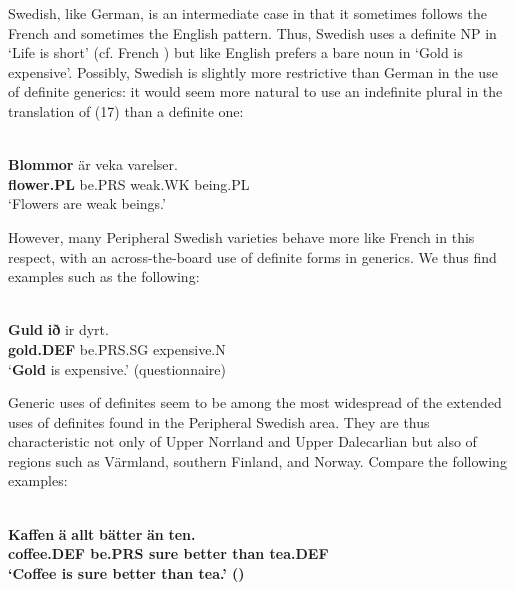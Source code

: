 
Swedish, like German, is an intermediate case in that it sometimes follows the French and sometimes the English pattern. Thus, Swedish uses a definite NP in  ‘Life is short’ (cf. French ) but like English prefers a bare noun in  ‘Gold is expensive’. Possibly, Swedish is slightly more restrictive than German in the use of definite generics: it would seem more natural to use an indefinite plural in the translation of (17) than a definite one:


\ea\label{}
\\
\gll	\textbf{Blommor} är  veka  varelser.\\
		\textbf{flower.PL} be.PRS  weak.WK  being.PL\\
\glt	‘Flowers are weak beings.’

\z

However, many Peripheral Swedish varieties behave more like French in this respect, with an across-the-board use of definite forms in generics. We thus find examples such as the following:



\ea\label{}
\\
\gll	\textbf{Guld} \textbf{ið} ir  dyrt.  \\
		\textbf{gold.DEF} be.PRS.SG  expensive.N  \\
\glt	‘\textbf{Gold} is expensive.’ (questionnaire)

\z

Generic uses of definites seem to be among the most widespread of the extended uses of definites found in the Peripheral Swedish area. They are thus characteristic not only of Upper Norrland and Upper Dalecarlian but also of regions such as Värmland, southern Finland, and Norway. Compare the following examples:



\ea\label{}
\\
\gll	\textbf{Kaffen} \textbf{ä} \textbf{  allt} \textbf{  bätter} \textbf{  än} \textbf{ten.}\\
		\bfseries coffee.DEF  be.PRS  sure  better   than  tea.DEF\\
\glt	‘Coffee is sure better than tea.’ (\citet{Broberg1936})

